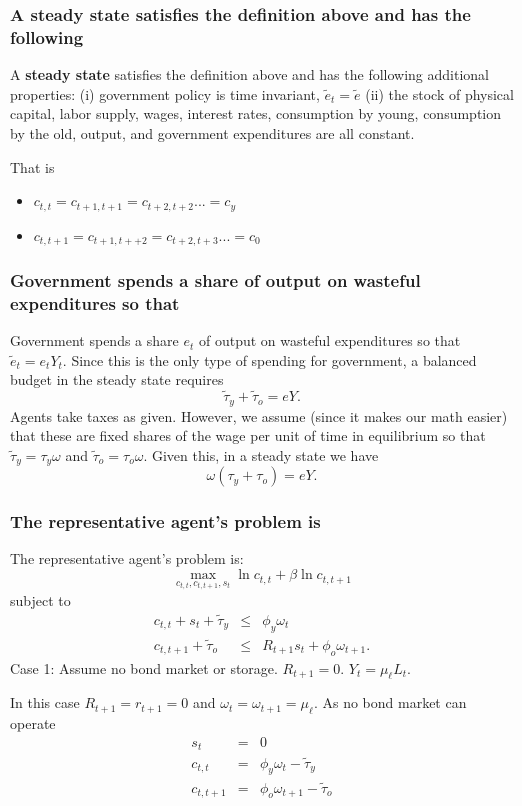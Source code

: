 \documentclass[aspectratio=169]{ltx-talk}
\begin{document}
\begin{frame}
\frametitle{A steady state satisfies the definition above and has the following}
A \textbf{steady state} satisfies the definition above and has the following
additional properties:\newline
(i) government policy is time invariant, $\tilde{e}_{t}=\tilde{e}$ \newline
(ii) the stock of physical capital, labor supply, wages, interest rates,
consumption by young, consumption by the old, output, and government
expenditures are all constant.

That is

\begin{itemize}
\item $c_{t,t}=c_{t+1,t+1}=c_{t+2,t+2}...=c_{y}$

\item $c_{t,t+1}=c_{t+1,t++2}=c_{t+2,t+3}...=c_{0}$
\end{itemize}
\end{frame}

\begin{frame}
\frametitle{Government spends a share of output on wasteful expenditures so that}
Government spends a share $e_{t}$ of output on wasteful expenditures so that 
$\tilde{e}_{t}=e_{t}Y_{t}$. Since this is the only type of spending for
government, a balanced budget in the steady state requires 
\begin{equation*}
\tilde{\tau}_{y}+\tilde{\tau}_{o}=eY.
\end{equation*}%
Agents take taxes as given. However, we assume (since it makes our math
easier) that these are fixed shares of the wage per unit of time in
equilibrium so that $\tilde{\tau}_{y}=\tau _{y}\omega $ and $\tilde{\tau}%
_{o}=\tau _{o}\omega $. Given this, in a steady state we have 
\begin{equation*}
\omega \left( \tau _{y}+\tau _{o}\right) =eY.
\end{equation*}%
\end{frame}

\begin{frame}
\frametitle{The representative agent{'}s problem is}
The representative agent's problem is: 
\begin{equation*}
\underset{c_{t,t},c_{t,t+1},s_{t}}{\max }\ln c_{t,t}+\beta \ln c_{t,t+1}
\end{equation*}%
subject to 
\begin{eqnarray*}
c_{t,t}+s_{t}+\tilde{\tau}_{y} &\leq &\phi _{y}\omega _{t} \\
c_{t,t+1}+\tilde{\tau}_{o} &\leq &R_{t+1}s_{t}+\phi _{o}\omega _{t+1}.
\end{eqnarray*}%
Case 1: Assume no bond market or storage. $R_{t+1}=0.$ $Y_{t}=\mu _{\ell
}L_{t}$.

In this case $R_{t+1}=r_{t+1}=0$ and $\omega _{t}=\omega _{t+1}=\mu _{\ell
}. $ As no bond market can operate%
\begin{eqnarray*}
s_{t} &=&0 \\
c_{t,t} &=&\phi _{y}\omega _{t}-\tilde{\tau}_{y} \\
c_{t,t+1} &=&\phi _{o}\omega _{t+1}-\tilde{\tau}_{o}
\end{eqnarray*}%
\end{frame}
\end{document}
